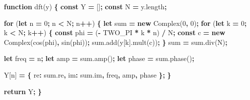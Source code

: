 \documentclass[
]{book}
\newenvironment{Shaded}{\begin{snugshade}}{\end{snugshade}}
\newcommand{\AttributeTok}[1]{\textcolor[rgb]{0.77,0.63,0.00}{#1}}
\newcommand{\ControlFlowTok}[1]{\textcolor[rgb]{0.13,0.29,0.53}{\textbf{#1}}}
\newcommand{\DataTypeTok}[1]{\textcolor[rgb]{0.13,0.29,0.53}{#1}}
\newcommand{\DecValTok}[1]{\textcolor[rgb]{0.00,0.00,0.81}{#1}}
\newcommand{\KeywordTok}[1]{\textcolor[rgb]{0.13,0.29,0.53}{\textbf{#1}}}
\newcommand{\NormalTok}[1]{#1}
\newcommand{\OperatorTok}[1]{\textcolor[rgb]{0.81,0.36,0.00}{\textbf{#1}}}
\newcommand{\VariableTok}[1]{\textcolor[rgb]{0.00,0.00,0.00}{#1}}
\begin{document}
\begin{Shaded}
\begin{Highlighting}[]
\KeywordTok{function} \AttributeTok{dft}\NormalTok{(y) }\OperatorTok{\{}
  \KeywordTok{const}\NormalTok{ Y }\OperatorTok{=}\NormalTok{ []}\OperatorTok{;}
  \KeywordTok{const}\NormalTok{ N }\OperatorTok{=} \VariableTok{y}\NormalTok{.}\AttributeTok{length}\OperatorTok{;}
  
  \ControlFlowTok{for}\NormalTok{ (}\KeywordTok{let}\NormalTok{ n }\OperatorTok{=} \DecValTok{0}\OperatorTok{;}\NormalTok{ n }\OperatorTok{<}\NormalTok{ N}\OperatorTok{;}\NormalTok{ n}\OperatorTok{++}\NormalTok{) }\OperatorTok{\{}
    \KeywordTok{let}\NormalTok{ sum }\OperatorTok{=} \KeywordTok{new} \AttributeTok{Complex}\NormalTok{(}\DecValTok{0}\OperatorTok{,} \DecValTok{0}\NormalTok{)}\OperatorTok{;}
    \ControlFlowTok{for}\NormalTok{ (}\KeywordTok{let}\NormalTok{ k }\OperatorTok{=} \DecValTok{0}\OperatorTok{;}\NormalTok{ k }\OperatorTok{<}\NormalTok{ N}\OperatorTok{;}\NormalTok{ k}\OperatorTok{++}\NormalTok{) }\OperatorTok{\{}
      \KeywordTok{const}\NormalTok{ phi }\OperatorTok{=}\NormalTok{ (}\OperatorTok{-}\NormalTok{ TWO_PI }\OperatorTok{*}\NormalTok{ k }\OperatorTok{*}\NormalTok{ n) }\OperatorTok{/}\NormalTok{ N}\OperatorTok{;}
      \KeywordTok{const}\NormalTok{ c }\OperatorTok{=} \KeywordTok{new} \AttributeTok{Complex}\NormalTok{(}\AttributeTok{cos}\NormalTok{(phi)}\OperatorTok{,} \AttributeTok{sin}\NormalTok{(phi))}\OperatorTok{;}
      \VariableTok{sum}\NormalTok{.}\AttributeTok{add}\NormalTok{(y[k].}\AttributeTok{mult}\NormalTok{(c))}\OperatorTok{;}
    \OperatorTok{\}}
\NormalTok{    sum }\OperatorTok{=} \VariableTok{sum}\NormalTok{.}\AttributeTok{div}\NormalTok{(N)}\OperatorTok{;}

    \KeywordTok{let}\NormalTok{ freq }\OperatorTok{=}\NormalTok{ n}\OperatorTok{;}
    \KeywordTok{let}\NormalTok{ amp }\OperatorTok{=} \VariableTok{sum}\NormalTok{.}\AttributeTok{amp}\NormalTok{()}\OperatorTok{;}
    \KeywordTok{let}\NormalTok{ phase }\OperatorTok{=} \VariableTok{sum}\NormalTok{.}\AttributeTok{phase}\NormalTok{()}\OperatorTok{;}
    
\NormalTok{    Y[n] }\OperatorTok{=} \OperatorTok{\{} \DataTypeTok{re}\OperatorTok{:} \VariableTok{sum}\NormalTok{.}\AttributeTok{re}\OperatorTok{,} \DataTypeTok{im}\OperatorTok{:} \VariableTok{sum}\NormalTok{.}\AttributeTok{im}\OperatorTok{,}\NormalTok{ freq}\OperatorTok{,}\NormalTok{ amp}\OperatorTok{,}\NormalTok{ phase }\OperatorTok{\};}
  \OperatorTok{\}}
  
  \ControlFlowTok{return}\NormalTok{ Y}\OperatorTok{;}
\OperatorTok{\}}
\end{Highlighting}
\end{Shaded}
\end{document}
